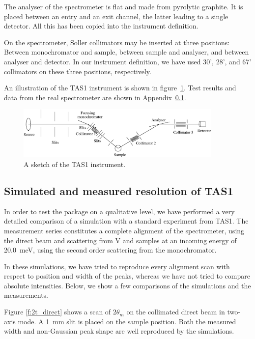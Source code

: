 The analyser of the spectrometer is flat and made from
pyrolytic graphite. It is placed between an entry and
an exit channel, the latter leading to a single detector.
All this has been copied into the instrument definition.

On the spectrometer, Soller collimators may be inserted
at three positions: Between monochromator and sample,
between sample and analyser, and between analyser and detector.
In our instrument definition, we have used 30', 28', and 67' collimators
on these three positions, respectively.

An illustration of the TAS1 instrument
is shown in figure~\ref{f:TAS1}.
Test results and data from the real spectrometer are shown
in Appendix~\ref{data:TAS1}.

\begin{figure}
  \begin{center}
    \includegraphics[width=0.9\textwidth]{figures/tas1.eps}
  \end{center}
\caption{A sketch of the TAS1 instrument.}
\label{f:TAS1}
\end{figure}

\subsection{Simulated and measured resolution of TAS1}
\label{data:TAS1}

In order to test the \MCS package on a qualitative level,
we have performed a very detailed comparison of a simulation with a
standard experiment from TAS1. The measurement series
constitutes a complete alignment of the spectrometer,
using the direct beam and scattering from V and 
samples at an incoming energy of 20.0~meV, using the second order
scattering from the monochromator.

In these simulations, we have tried to reproduce
every alignment scan with respect to position and width
of the peaks, whereas we have not tried to compare
absolute intensities. Below, we show a few comparisons
of the simulations and the measurements.

Figure \ref{f:2t_direct} shows a scan of
$2\theta_m$ on the collimated direct beam in two-axis mode.
A \hbox{1 mm} slit is placed on the sample position.
Both the measured width and non-Gaussian peak shape
are well reproduced by the \MCS simulations.

